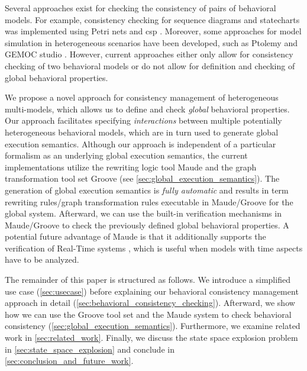 \documentclass{jot}
\begin{document}
Several approaches exist for checking the consistency of pairs of behavioral models.
For example, consistency checking for sequence diagrams and statecharts was implemented using Petri nets \cite{yaoConsistencyCheckingUML2006} and \gls*{csp} \cite{kusterExplicitBehavioralConsistency2003}.
Moreover, some approaches for model simulation in heterogeneous scenarios have been developed, such as Ptolemy \cite{ekerTamingHeterogeneityPtolemy2003, leeDisciplinedHeterogeneousModeling2010} and GEMOC studio \cite{deantoniModelingBehavioralSemantics2016, varalarsenBCoolBehavioralCoordination2016}.
However, current approaches either only allow for consistency checking of two behavioral models or do not allow for definition and checking of global behavioral properties.

We propose a novel approach for consistency management of heterogeneous multi-models, which allows us to define and check \emph{global} behavioral properties.
Our approach facilitates specifying \emph{interactions} between multiple potentially heterogeneous behavioral models, which are in turn used to generate global execution semantics.
Although our approach is independent of a particular formalism as an underlying global execution semantics, the current implementations utilize the rewriting logic tool Maude and the graph transformation tool set Groove (see \autoref{sec:global_execution_semantics}).
The generation of global execution semantics is \textit{fully automatic} and results in term rewriting rules/graph transformation rules executable in Maude/Groove for the global system.
Afterward, we can use the built-in verification mechanisms in Maude/Groove to check the previously defined global behavioral properties.
A potential future advantage of Maude is that it additionally supports the verification of Real-Time systems \cite{olveczkySemanticsPragmaticsRealTime2007, duranVerifyingTimedBPMN2017}, which is useful when models with time aspects have to be analyzed.

The remainder of this paper is structured as follows.
We introduce a simplified use case (\autoref{sec:usecase}) before explaining our behavioral consistency management approach in detail (\autoref{sec:behavioral_consistency_checking}).
Afterward, we show how we can use the Groove tool set and the Maude system to check behavioral consistency (\autoref{sec:global_execution_semantics}).
Furthermore, we examine related work in \autoref{sec:related_work}.
Finally, we discuss the state space explosion problem in \autoref{sec:state_space_explosion} and conclude in \autoref{sec:conclusion_and_future_work}.
\end{document}
